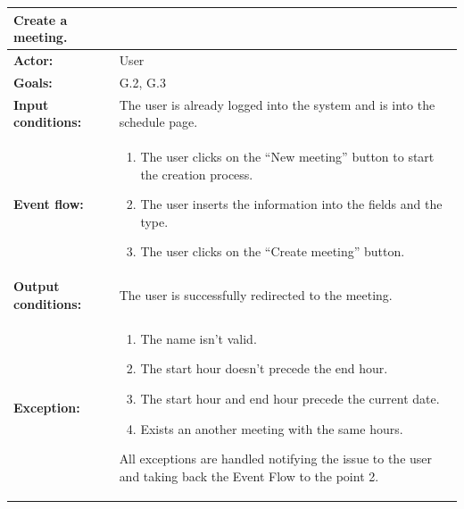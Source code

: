 \begin{tabular} { p{5cm} p{8cm} }  
\textbf{Create a meeting.}\\
\hline
\textbf{Actor:} & User \\ 
\textbf{Goals:} & G.2, G.3 \\ 
\textbf{Input conditions:} & The user is already logged into the system and is into the schedule page. \\
\textbf{Event flow:} & \begin{enumerate}
				\item
				The user clicks on the “New meeting” button to start the creation process.
				\item
				The user inserts the information  into the fields and the type.
				\item
				The user clicks on the “Create meeting” button.
			\end{enumerate}\\ 
\textbf{Output conditions:} & The user is successfully redirected to the
meeting.\\ 
\textbf{Exception:} & \begin{enumerate}
				\item
				The name isn’t valid.
				\item
				The start hour doesn’t precede the end hour.
				\item
				The start hour and end hour precede the current date.
				\item
				Exists an another meeting with the same hours. 
			\end{enumerate}
All exceptions are handled notifying the issue to the user and taking back the Event Flow to the point 2.
\\
\hline
\end{tabular}


